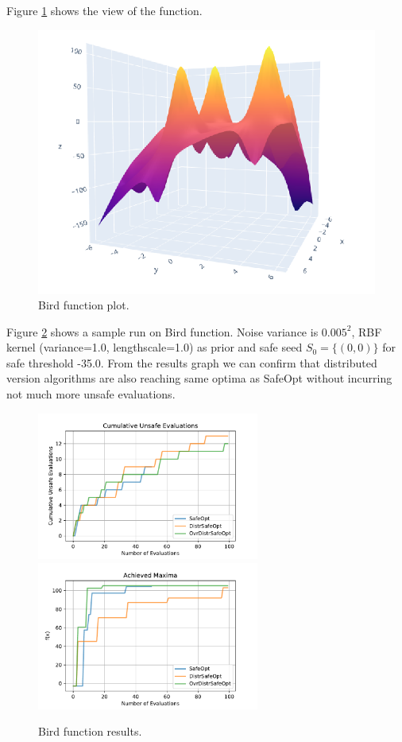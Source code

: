 Figure \ref{fig:bird-function-plot} shows the view of the function.

\begin{figure}[H]
	\centering
	\includegraphics[scale=0.4]{figures/bird-function-plot.png}
	\caption{Bird function plot.}
	\label{fig:bird-function-plot}
\end{figure}

Figure \ref{fig:bird-result} shows a sample run on Bird function. Noise variance is $0.005^2$, RBF kernel (variance=1.0, lengthscale=1.0) as prior and safe seed $S_0=\{ (0,0) \}$ for safe threshold -35.0. From the results graph we can confirm that distributed version algorithms are also reaching same optima as SafeOpt without incurring not much more unsafe evaluations.
\begin{figure}[H]
	\centering
	\includegraphics[width=0.65\textwidth]{figures/results/bird-cum-unsafe.pdf}
	\includegraphics[width=0.65\textwidth]{figures/results/bird-maxima.pdf}
	\caption{Bird function results.}
	\label{fig:bird-result}
\end{figure}

